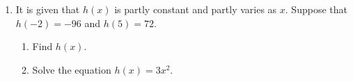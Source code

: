 \documentclass[11pt]{article}
\begin{document}
\begin{enumerate}
            \hrulefill

            \hrulefill
            
            \hrulefill
            
            \hrulefill
            
            \hrulefill
            
            \hrulefill
            
            \hrulefill
            
            \hrulefill
            
            \hrulefill
            
            \hrulefill
            
            \hrulefill
            
            \hrulefill

        \pagebreak
        \item It is given that $h(x)$ is partly constant and partly varies as $x$. Suppose that $h(-2)=-96$ and $h(5)=72$.\begin{enumerate}
            \item Find $h(x)$.
            \item Solve the equation $h(x)=3x^2$.
        \end{enumerate}

        \hrulefill
            
            \hrulefill
            
            \hrulefill
            
            \hrulefill
            
            \hrulefill
            
            \hrulefill
            
            \hrulefill
            
            \hrulefill
            
            \hrulefill
            
            \hrulefill
            
            \hrulefill

            \hrulefill

            \hrulefill
            
            \hrulefill
            
            \hrulefill
            
            \hrulefill
            
            \hrulefill
            

\end{enumerate}
\end{document}
